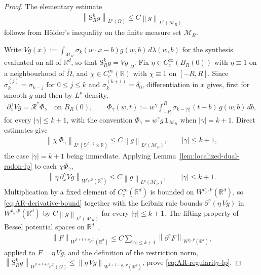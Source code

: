 \documentclass[12pt]{article}
\numberwithin{equation}{section}
\numberwithin{figure}{section}
\numberwithin{equation}{section}
\begin{document}
\begin{proof}
The elementary estimate
\begin{align}
    \left\|\mathrm{S}^k_R g\right\|_{L^p(\Omega)}
    \le C\left\|g\right\|_{L^p(\mathcal{M}_R)}
    \label{eq:AR-elementary-Lp}
\end{align}
follows from H\"older's inequality on the finite measure set $\mathcal{M}_R$.

Write $Vg(x):=\int_{\mathcal{M}_R}\sigma_k(w\cdot x-b)g(w,b)\,d\lambda(w,b)$ for the
synthesis evaluated on all of $\mathbb{R}^d$, so that $\mathrm{S}^k_Rg=Vg|_\Omega$.
Fix $\eta\in C_c^\infty(B_R(0))$ with $\eta\equiv1$ on a neighbourhood of
$\overline{\Omega}$, and $\chi\in C_c^\infty(\mathbb{R})$ with $\chi\equiv1$ on
$[-R,R]$. Since $\sigma_k^{(j)}=\sigma_{k-j}$ for $0\le j\le k$ and
$\sigma_k^{(k+1)}=\delta_0$, differentiation in $x$ gives, first for smooth $g$
and then by $L^p$ density,
\begin{align}
    \partial_x^\gamma Vg=\mathcal{R}^{*}\Phi_\gamma
    \quad\text{on }B_R(0),
    \qquad
    \Phi_\gamma(w,t):=w^\gamma\int_{-R}^{R}
    \sigma_{k-\left|\gamma\right|}(t-b)\,g(w,b)\,db,
    \label{eq:AR-derivative-identity}
\end{align}
for every $\left|\gamma\right|\le k+1$, with the convention
$\Phi_\gamma=w^\gamma g\,\mathbf{1}_{\mathcal{M}_R}$ when
$\left|\gamma\right|=k+1$. Direct estimates give
\begin{align*}
    \left\|\chi\,\Phi_\gamma\right\|_{L^p(\mathbb{S}^{d-1}\times\mathbb{R})}
    \le C\left\|g\right\|_{L^p(\mathcal{M}_R)},
    \qquad \left|\gamma\right|\le k+1,
\end{align*}
the case $\left|\gamma\right|=k+1$ being immediate. Applying
Lemma~\ref{lem:localized-dual-radon-lp} to each $\chi\Phi_\gamma$,
\begin{align}
    \left\|\eta\,\partial_x^\gamma Vg\right\|_{W^{\rho_p,p}(\mathbb{R}^d)}
    \le C\left\|g\right\|_{L^p(\mathcal{M}_R)},
    \qquad \left|\gamma\right|\le k+1 .
    \label{eq:AR-derivative-bound}
\end{align}
Multiplication by a fixed element of $C_c^\infty(\mathbb{R}^d)$ is bounded on
$W^{\rho_p,p}(\mathbb{R}^d)$, so \eqref{eq:AR-derivative-bound} together with the
Leibniz rule bounds $\partial^\gamma(\eta\,Vg)$ in $W^{\rho_p,p}(\mathbb{R}^d)$ by
$C\left\|g\right\|_{L^p(\mathcal{M}_R)}$ for every $\left|\gamma\right|\le k+1$. The
lifting property of Bessel potential spaces on
$\mathbb{R}^d$~\cite{stein_harmonicanalysis_1993,triebel2008function},
\begin{align*}
    \left\|F\right\|_{W^{k+1+\rho_p,p}(\mathbb{R}^d)}
    \le C\sum_{\left|\gamma\right|\le k+1}
    \left\|\partial^\gamma F\right\|_{W^{\rho_p,p}(\mathbb{R}^d)},
\end{align*}
applied to $F=\eta\,Vg$, and the definition of the restriction norm,
$\left\|\mathrm{S}^k_Rg\right\|_{W^{k+1+\rho_p,p}(\Omega)}
\le\left\|\eta\,Vg\right\|_{W^{k+1+\rho_p,p}(\mathbb{R}^d)}$, prove
\eqref{eq:AR-regularity-lp}.
\end{proof}
\end{document}

